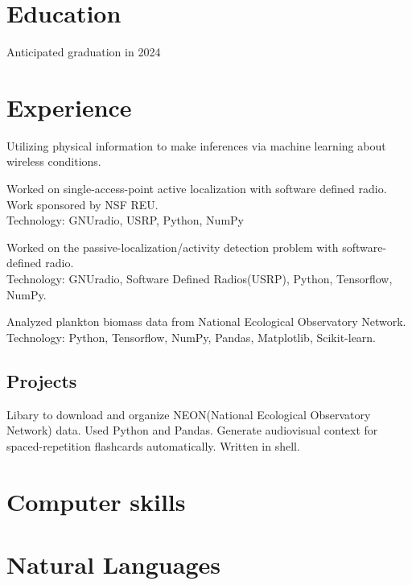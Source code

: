 \documentclass[10pt, letterpaper]{moderncv}
\begin{document}
\makecvtitle

\section{Education}
{Anticipated graduation in 2024}{}

\section{Experience}
{Utilizing physical information to make inferences via machine learning about wireless conditions.}

{Worked on single-access-point active localization with software
  defined radio. Work sponsored by NSF REU. \\
Technology: GNUradio, USRP, Python, NumPy}

{Worked on the passive-localization/activity detection problem with
  software-defined radio.\\
Technology: GNUradio, Software Defined Radios(USRP), Python, Tensorflow, NumPy.}

{Analyzed plankton biomass data from National Ecological Observatory Network.
\\Technology: Python, Tensorflow, NumPy, Pandas, Matplotlib, Scikit-learn.}

\subsection{Projects}
    {Libary to download and organize NEON(National Ecological Observatory Network) data. Used Python and Pandas.}
    {Generate audiovisual context for spaced-repetition flashcards automatically. Written in shell.}

\section{Computer skills}

\section{Natural Languages}
\end{document}
